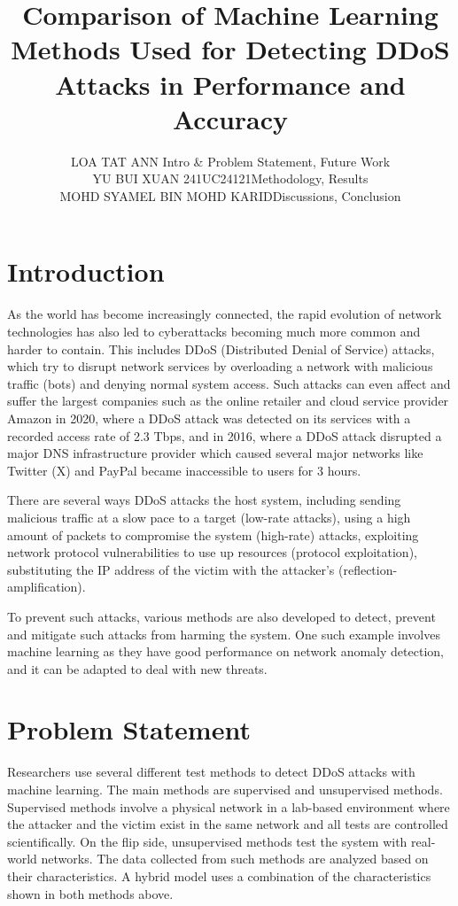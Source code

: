 \documentclass[a4paper, 12pt]{article}
\author{
LOA TAT ANN \quad 1221304731 \quad Intro \& Problem Statement, Future Work\\
YU BUI XUAN \quad 241UC24121\quad Methodology, Results\\
MOHD SYAMEL BIN MOHD KARID\quad 1221309130\quad Discussions, Conclusion\\
}
\title{Comparison of Machine Learning Methods Used for Detecting DDoS Attacks in Performance and Accuracy}
\begin{document}
\maketitle

\section{Introduction}
As the world has become increasingly connected, the rapid evolution of network technologies has also led to cyberattacks becoming much more common and harder to contain. This includes DDoS (Distributed Denial of Service) attacks, which try to disrupt network services by overloading a network with malicious traffic (bots) and denying normal system access.  Such attacks can even affect and suffer the largest companies such as the online retailer and cloud service provider Amazon in 2020, where a DDoS attack was detected on its services with a recorded access rate of 2.3 Tbps, and in 2016, where a DDoS attack disrupted a major DNS infrastructure provider which caused several major networks like Twitter (X) and PayPal became inaccessible to users for 3 hours.  

There are several ways DDoS attacks the host system, including sending malicious traffic at a slow pace to a target (low-rate attacks), using a high amount of packets to compromise the system (high-rate) attacks, exploiting network protocol vulnerabilities to use up resources (protocol exploitation), substituting the IP address of the victim with the attacker's (reflection-amplification). 


To prevent such attacks, various methods are also developed to detect, prevent and mitigate such attacks from harming the system. One such example involves machine learning as they have good performance on network anomaly detection, and it can be adapted to deal with new threats. 

\section{Problem Statement}
Researchers use several different test methods to detect DDoS attacks with machine learning. The main methods are supervised and unsupervised methods. Supervised methods involve a physical network in a lab-based environment where the attacker and the victim exist in the same network and all tests are controlled scientifically. On the flip side, unsupervised methods test the system with real-world networks. The data collected from such methods are analyzed based on their characteristics. A hybrid model uses a combination of the characteristics shown in both methods above. 
\end{document}
